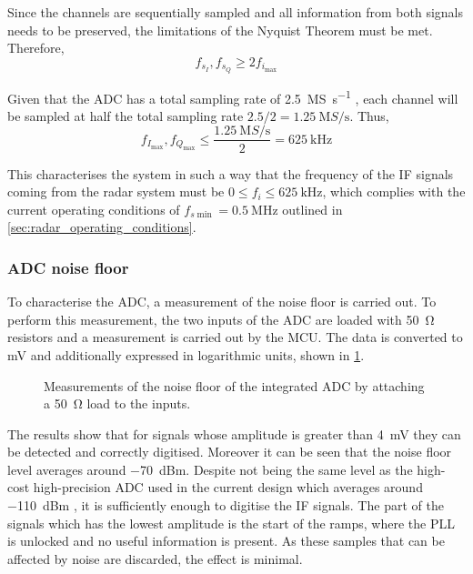 Since the channels are sequentially sampled and all information from both signals needs to be preserved, the limitations of the Nyquist Theorem \cite{Shannon1949} must be met. Therefore,
\begin{equation} \label{eqn:nyquist_sampling}
	f_{s_{I}}, f_{s_{Q}} \ge 2 f_{i_{\max}}
\end{equation}

Given that the ADC has a total sampling rate of \SI{2.5}{\mega S\per\second} \cite[p.~103]{STMicroelectronics2022}, each channel will be sampled at half the total sampling rate $2.5/2 = \SI{1.25}{\mega S\per\second}$. Thus,
\begin{equation} \label{eqn:nyquist_sampling_f_lim}
	f_{I_{\max}}, f_{Q_{\max}} \le \frac{\SI{1.25}{\mega S\per\second}}{2} = \SI{625}{\kilo\hertz}
\end{equation}

This characterises the system in such a way that the frequency of the IF signals coming from the radar system must be $ 0 \le f_i \le \SI{625}{\kilo\hertz}$, which complies with the current operating conditions of $f_{s\min} = \SI{0.5}{\mega\hertz}$ outlined in \cref{sec:radar_operating_conditions}.

\subsubsection{ADC noise floor}
To characterise the ADC, a measurement of the noise floor is carried out. To perform this measurement, the two inputs of the ADC are loaded with \SI{50}{\ohm} resistors and a measurement is carried out by the MCU. The data is converted to mV and additionally expressed in logarithmic units, shown in \cref{fig:adc_nf}.

\begin{figure}[htb]
	\centering
	\caption{Measurements of the noise floor of the integrated ADC by attaching a \SI{50}{\ohm} load to the inputs. \label{fig:adc_nf}}
\end{figure}

The results show that for signals whose amplitude is greater than \SI{4}{\milli\volt} they can be detected and correctly digitised. Moreover it can be seen that the noise floor level averages around \SI{-70}{dBm}. Despite not being the same level as the high-cost high-precision ADC used in the current design which averages around \SI{-110}{dBm} \cite{ADLINKTechnologies2010}, it is sufficiently enough to digitise the IF signals. The part of the signals which has the lowest amplitude is the start of the ramps, where the PLL is unlocked and no useful information is present. As these samples that can be affected by noise are discarded, the effect is minimal.

